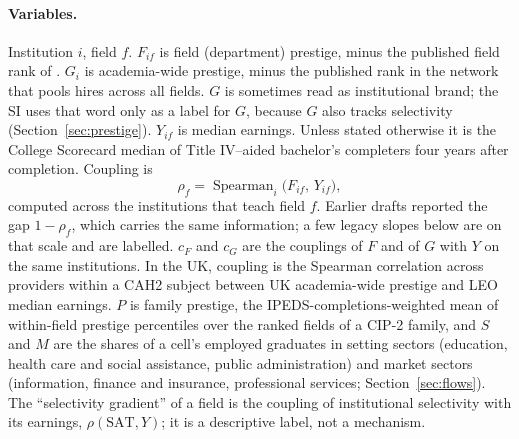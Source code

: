 \documentclass[11pt]{article}
\begin{document}
\paragraph{Variables.} Institution $i$, field $f$. $F_{if}$ is field (department) prestige, minus the
published field rank of \citet{wapman2022quantifying}. $G_i$ is academia-wide prestige, minus the published
rank in the network that pools hires across all fields. $G$ is sometimes read as institutional brand; the SI
uses that word only as a label for $G$, because $G$ also tracks selectivity (Section~\ref{sec:prestige}).
$Y_{if}$ is median earnings. Unless stated otherwise it is the College Scorecard median of Title IV--aided
bachelor's completers four years after completion. Coupling is
\begin{equation}
\rho_f=\operatorname{Spearman}_i\big(F_{if},\,Y_{if}\big),\label{eq:coupling}
\end{equation}
computed across the institutions that teach field $f$. Earlier drafts reported the gap $1-\rho_f$, which
carries the same information; a few legacy slopes below are on that scale and are labelled. $c_F$ and $c_G$
are the couplings of $F$ and of $G$ with $Y$ on the same institutions. In the UK, coupling is the Spearman
correlation across providers within a CAH2 subject between UK academia-wide prestige and LEO median
earnings. $P$ is family prestige, the IPEDS-completions-weighted mean of within-field prestige percentiles
over the ranked fields of a CIP-2 family, and $S$ and $M$ are the shares of a cell's employed graduates in
setting sectors (education, health care and social assistance, public administration) and market sectors
(information, finance and insurance, professional services; Section~\ref{sec:flows}). The ``selectivity
gradient'' of a field is the coupling of institutional selectivity with its earnings, $\rho(\text{SAT},Y)$; it
is a descriptive label, not a mechanism.
\end{document}
